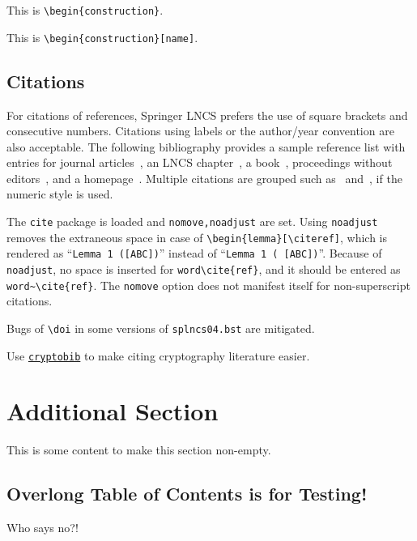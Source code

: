 \begin{construction}
This is \texttt{\textbackslash begin\{construction\}}.
\end{construction}

\begin{construction}
[name]
This is \texttt{\textbackslash begin\{construction\}[name]}.
\end{construction}

\subsection{Citations}

For citations of references, Springer LNCS prefers the use of square brackets
and consecutive numbers. Citations using labels or the author/year
convention are also acceptable. The following bibliography provides
a sample reference list with entries for journal
articles~\cite{ref_article1}, an LNCS chapter~\cite{ref_lncs1}, a
book~\cite{ref_book1}, proceedings without editors~\cite{ref_proc1},
and a homepage~\cite{ref_url1}. Multiple citations are grouped
such as~\cite{ref_article1,ref_lncs1,ref_book1}
and~\cite{ref_article1,ref_book1,ref_proc1,ref_url1},
if the numeric style is used.

The \texttt{cite} package is loaded and \texttt{nomove,noadjust} are set.
Using \texttt{noadjust} removes the extraneous space
in case of \texttt{\textbackslash begin\{lemma\}[\textbackslash cite{ref}]},
which is rendered as ``\texttt{Lemma 1 ([ABC])}''
instead of ``\texttt{Lemma 1 ( [ABC])}''.
Because of \texttt{noadjust},
no space is inserted for \texttt{word\textbackslash cite\{ref\}},
and it should be entered as
\texttt{word\textasciitilde\textbackslash cite\{ref\}}.
The \texttt{nomove} option does not manifest itself
for non-superscript citations.

Bugs of \texttt{\textbackslash doi}
in some versions of \texttt{splncs04.bst}
are mitigated.

Use
\href{https://github.com/cryptobib/export}{\texttt{cryptobib}}
to make citing cryptography literature easier.

\long\def\myrepeat#1\relax{#1\relax#1\relax}

\myrepeat\myrepeat\myrepeat\myrepeat\myrepeat
{}
\section{Additional Section }
This is some content to make this section non-empty.
\relax

\let\myrepeat\relax
\let\mysection\relax

\subsection{Overlong Table of Contents is for Testing!}

Who says no?!
